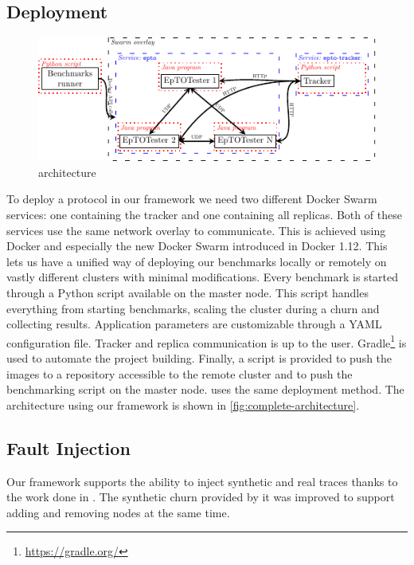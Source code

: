 \subsection{Deployment}
 \begin{figure}[htp]
 	\centering
 	\includegraphics[width=\linewidth]{figures/complete-architecture.pdf}
 	\vspace{-2mm} 
 	\caption[Caption]{\eptotester architecture\footnotemark}
 	\vspace{-2mm} 
 	\label{fig:complete-architecture}
 \end{figure}
To deploy a protocol in our framework we need two different Docker Swarm services: one containing the tracker and one containing all replicas. Both of these services use the same network overlay to communicate. This is achieved using Docker and especially the new Docker Swarm introduced in Docker 1.12. This lets us have a unified way of deploying our benchmarks locally or remotely on vastly different clusters with minimal modifications. Every benchmark is started through a Python script available on the master node. This script handles everything from starting benchmarks, scaling the cluster during a churn and collecting results. Application parameters are customizable through a YAML configuration file. Tracker and replica communication is up to the user.
Gradle\footnote{\href{https://gradle.org/}{https://gradle.org/}} is used to automate the project building. Finally, a script is provided to push the images to a repository accessible to the remote cluster and to push the benchmarking script on the master node. \jgroups uses the same deployment method. The \epto architecture using our framework is shown in \autoref{fig:complete-architecture}.
\subsection{Fault Injection}
Our framework supports the ability to inject synthetic and real traces thanks to the work done in \autocite{vaucher2016erasure}. The synthetic churn provided by it was improved to support adding and removing nodes at the same time.

